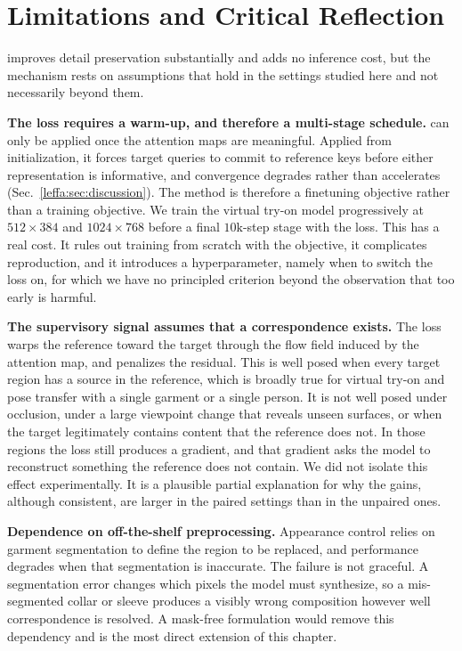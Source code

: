 \section{Limitations and Critical Reflection}
\label{leffa:sec:limitations}
\leffa{} improves detail preservation substantially and adds no inference cost, but the mechanism rests on assumptions that hold in the settings studied here and not necessarily beyond them.

\noindent \textbf{The loss requires a warm-up, and therefore a multi-stage schedule.}
\leffa{} can only be applied once the attention maps are meaningful. Applied from initialization, it forces target queries to commit to reference keys before either representation is informative, and convergence degrades rather than accelerates (Sec.~\ref{leffa:sec:discussion}). The method is therefore a finetuning objective rather than a training objective. We train the virtual try-on model progressively at $512 \times 384$ and $1024 \times 768$ before a final $10\text{k}$-step stage with the \leffa{} loss. This has a real cost. It rules out training from scratch with the objective, it complicates reproduction, and it introduces a hyperparameter, namely when to switch the loss on, for which we have no principled criterion beyond the observation that too early is harmful.

\noindent \textbf{The supervisory signal assumes that a correspondence exists.}
The loss warps the reference toward the target through the flow field induced by the attention map, and penalizes the residual. This is well posed when every target region has a source in the reference, which is broadly true for virtual try-on and pose transfer with a single garment or a single person. It is not well posed under occlusion, under a large viewpoint change that reveals unseen surfaces, or when the target legitimately contains content that the reference does not. In those regions the loss still produces a gradient, and that gradient asks the model to reconstruct something the reference does not contain. We did not isolate this effect experimentally. It is a plausible partial explanation for why the gains, although consistent, are larger in the paired settings than in the unpaired ones.

\noindent \textbf{Dependence on off-the-shelf preprocessing.}
Appearance control relies on garment segmentation to define the region to be replaced, and performance degrades when that segmentation is inaccurate. The failure is not graceful. A segmentation error changes which pixels the model must synthesize, so a mis-segmented collar or sleeve produces a visibly wrong composition however well correspondence is resolved. A mask-free formulation would remove this dependency and is the most direct extension of this chapter.

